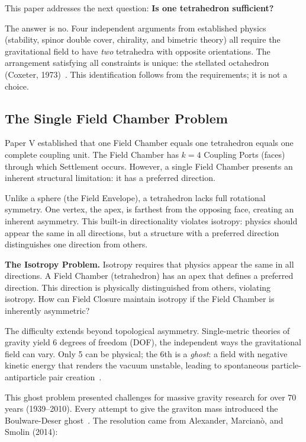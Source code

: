 \documentclass[aps,prd,preprint,superscriptaddress,showpacs,preprintnumbers,amsmath,amssymb,nofootinbib]{revtex4-2}
\begin{document}
This paper addresses the next question: \textbf{Is one tetrahedron sufficient?}

The answer is no. Four independent arguments from established physics (stability, spinor double cover, chirality, and bimetric theory) all require the gravitational field to have \emph{two} tetrahedra with opposite orientations. The arrangement satisfying all constraints is unique: the stellated octahedron (Coxeter, 1973)~\cite{coxeter1973}. This identification follows from the requirements; it is not a choice.

\subsection{The Single Field Chamber Problem}
\label{subsec:single-chamber}

Paper V established that one Field Chamber equals one tetrahedron equals one complete coupling unit. The Field Chamber has $k=4$ Coupling Ports (faces) through which Settlement occurs. However, a single Field Chamber presents an inherent structural limitation: it has a preferred direction.

Unlike a sphere (the Field Envelope), a tetrahedron lacks full rotational symmetry. One vertex, the apex, is farthest from the opposing face, creating an inherent asymmetry. This built-in directionality violates isotropy: physics should appear the same in all directions, but a structure with a preferred direction distinguishes one direction from others.

\textbf{The Isotropy Problem.} Isotropy requires that physics appear the same in all directions. A Field Chamber (tetrahedron) has an apex that defines a preferred direction. This direction is physically distinguished from others, violating isotropy. How can Field Closure maintain isotropy if the Field Chamber is inherently asymmetric?

The difficulty extends beyond topological asymmetry. Single-metric theories of gravity yield 6 degrees of freedom (DOF), the independent ways the gravitational field can vary. Only 5 can be physical; the 6th is a \emph{ghost}: a field with negative kinetic energy that renders the vacuum unstable, leading to spontaneous particle-antiparticle pair creation~\cite{hinterbichler2012}.

This ghost problem presented challenges for massive gravity research for over 70 years (1939--2010). Every attempt to give the graviton mass introduced the Boulware-Deser ghost~\cite{boulware1972}. The resolution came from Alexander, Marcian\`o, and Smolin (2014):
\end{document}
